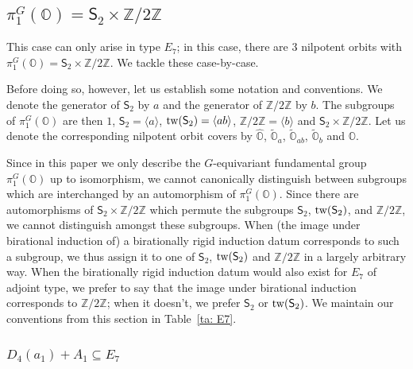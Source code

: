\documentclass[11pt]{amsart}
\renewcommand{\O}{{\mathbb O}}
\newcommand{\bZ}{{\mathbb Z}}
\newcommand{\Sym}{{\mathsf{S}}}
\newcommand{\tw}{{{\mbox{\rm tw}}}}
\newcommand{\covO}{\widetilde{\O}}
\newcommand{\hatO}{\widehat{\O}}
\numberwithin{equation}{section}
\begin{document}
	
	
	\subsection{\texorpdfstring{$\pi_1^G(\O)=\Sym_2\times\bZ/2\bZ$}{pi=S2Z2}}\label{ss: pi=S2Z2}
	
	This case can only arise in type $E_7$; in this case, there are 3 nilpotent orbits with $\pi_1^G(\O)=\Sym_2\times \bZ/2\bZ$. We tackle these case-by-case.
	
	Before doing so, however, let us establish some notation and conventions. We denote the generator of $\Sym_2$ by $a$ and the generator of $\bZ/2\bZ$ by $b$. The subgroups of $\pi_1^G(\O)$ are then $1$, $\Sym_2=\langle a\rangle$, $\tw(\Sym_2)=\langle ab\rangle$, $\bZ/2\bZ=\langle b\rangle$ and $\Sym_2\times \bZ/2\bZ$. Let us denote the corresponding nilpotent orbit covers by $\hatO$, $\covO_a$, $\covO_{ab}$, $\covO_b$ and $\O$. 
	
	Since in this paper we only describe the $G$-equivariant fundamental group $\pi_1^G(\O)$ up to isomorphism, we cannot canonically distinguish between subgroups which are interchanged by an automorphism of $\pi_1^G(\O)$. Since there are automorphisms of $\Sym_2\times\bZ/2\bZ$ which permute the subgroups $\Sym_2$, $\tw(\Sym_2)$, and $\bZ/2\bZ$, we cannot distinguish amongst these subgroups. When (the image under birational induction of) a birationally rigid induction datum corresponds to such a subgroup, we thus assign it to one of $\Sym_2$, $\tw(\Sym_2)$ and $\bZ/2\bZ$ in a largely arbitrary way. When the birationally rigid induction datum would also exist for $E_7$ of adjoint type, we prefer to say that the image under birational induction corresponds to $\bZ/2\bZ$; when it doesn't, we prefer $\Sym_2$ or $\tw(\Sym_2)$. We maintain our conventions from this section in Table~\ref{ta: E7}.
	
	\subsubsection{\texorpdfstring{$D_4(a_1)+A_1\subseteq E_7$}{D4a1A1 in E7}}\label{sss: D4a1A1 in E7}
	
\end{document}
